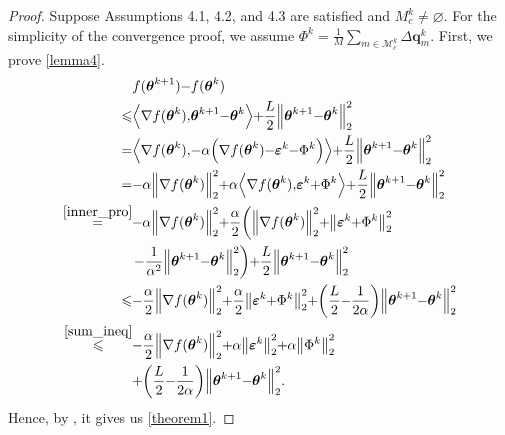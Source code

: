 \documentclass[lettersize,journal]{IEEEtran}
\begin{document}
\begin{proof}
    Suppose Assumptions 4.1, 4.2, and 4.3 are satisfied and $M_c^k \neq \varnothing$. For the simplicity of the convergence proof, we assume $\Phi^k = \frac{1}{M}\sum_{m \in \mathcal{M}_c^k}\Delta \boldsymbol{q}_{m}^{k}$. First, we prove \cref{lemma4}.
\begin{equation}
\thinmuskip=0mu
\medmuskip=-0.5mu
\thickmuskip=0mu
\begin{aligned}
\phantom{\leqslant}& f(\boldsymbol{\theta}^{k+1})-f(\boldsymbol{\theta}^k) \\
\leqslant &\left\langle\nabla f(\boldsymbol{\theta}^k), \boldsymbol{\theta}^{k+1}-\boldsymbol{\theta}^k\right\rangle+\frac{L}{2}\left\|\boldsymbol{\theta}^{k+1}-\boldsymbol{\theta}^k\right\|_2^2\\
= & \left\langle\nabla f(\boldsymbol{\theta}^k),-\alpha\left(\nabla f(\boldsymbol{\theta}^k)-\boldsymbol{\varepsilon}^k-\Phi^k\right)\right\rangle+\frac{L}{2}\left\|\boldsymbol{\theta}^{k+1}-\boldsymbol{\theta}^k\right\|_2^2\\
=& -\alpha\left\|\nabla f(\boldsymbol{\theta}^k)\right\|_2^2+\alpha \left\langle\nabla f(\boldsymbol{\theta}^k),\boldsymbol{\varepsilon}^k+\Phi^k\right\rangle+\frac{L}{2}\left\|\boldsymbol{\theta}^{k+1}-\boldsymbol{\theta}^k\right\|_2^2 \\
 \overset{\eqref{inner_pro}}{=}& -\alpha\left\|\nabla f(\boldsymbol{\theta}^k)\right\|_2^2+ \frac{\alpha}{2}\left( \left\|\nabla f(\boldsymbol{\theta}^k)\right\|_2^2 + \left\|\boldsymbol{\varepsilon}^k+\Phi^k\right\|_2^2 \right.\\
 &\left.- \frac{1}{\alpha^2} \left\|\boldsymbol{\theta}^{k+1} - \boldsymbol{\theta}^{k}\right\|_2^2 \right) +\frac{L}{2}\left\|\boldsymbol{\theta}^{k+1}-\boldsymbol{\theta}^k\right\|_2^2 \\
\leqslant &  -\frac{\alpha}{2}\left\|\nabla f(\boldsymbol{\theta}^k)\right\|_2^2 + \frac{\alpha}{2}\left\|\boldsymbol{\varepsilon}^k+\Phi^k\right\|_2^2 + \left( \frac{L}{2} - \frac{1}{2\alpha}\right) \left\|\boldsymbol{\theta}^{k+1} - \boldsymbol{\theta}^{k}\right\|_2^2 \\
 \overset{\eqref{sum_ineq}}{\leqslant} & -\frac{\alpha}{2}\left\|\nabla f(\boldsymbol{\theta}^k)\right\|_2^2 + \alpha \left\|\boldsymbol{\varepsilon}^k\right\|_2^2+\alpha\left\|\Phi^k\right\|_2^2 \\
 &+ \left( \frac{L}{2} - \frac{1}{2\alpha}\right) \left\|\boldsymbol{\theta}^{k+1} - \boldsymbol{\theta}^{k}\right\|_2^2.
\end{aligned}
\label{lemma4_1}
\end{equation}
Hence, by , it gives us \cref{theorem1}. 
\end{proof}
\end{document}
